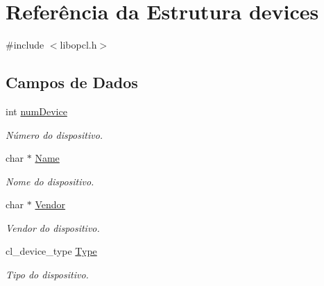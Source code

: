 \hypertarget{structdevices}{}\section{Referência da Estrutura devices}
\label{structdevices}


{\ttfamily \#include $<$libopcl.\+h$>$}

\subsection*{Campos de Dados}
\begin{DoxyCompactItemize}
\item 
\hypertarget{structdevices_a6856fb3bba012c7b3abcfbe847ea4d27}{}\label{structdevices_a6856fb3bba012c7b3abcfbe847ea4d27} 
int \hyperlink{structdevices_a6856fb3bba012c7b3abcfbe847ea4d27}{num\+Device}
\begin{DoxyCompactList}\small\item\em Número do dispositivo. \end{DoxyCompactList}\item 
\hypertarget{structdevices_a5e6182c030324511dd82e9fa1a0ab071}{}\label{structdevices_a5e6182c030324511dd82e9fa1a0ab071} 
char $\ast$ \hyperlink{structdevices_a5e6182c030324511dd82e9fa1a0ab071}{Name}
\begin{DoxyCompactList}\small\item\em Nome do dispositivo. \end{DoxyCompactList}\item 
\hypertarget{structdevices_a3edc9ba9f59b30aa97a8d6d258caa80f}{}\label{structdevices_a3edc9ba9f59b30aa97a8d6d258caa80f} 
char $\ast$ \hyperlink{structdevices_a3edc9ba9f59b30aa97a8d6d258caa80f}{Vendor}
\begin{DoxyCompactList}\small\item\em Vendor do dispositivo. \end{DoxyCompactList}\item 
\hypertarget{structdevices_af66389a0175743dbb20408cc354de4f1}{}\label{structdevices_af66389a0175743dbb20408cc354de4f1} 
cl\+\_\+device\+\_\+type \hyperlink{structdevices_af66389a0175743dbb20408cc354de4f1}{Type}
\begin{DoxyCompactList}\small\item\em Tipo do dispositivo. \end{DoxyCompactList}\item 
\hypertarget{structdevices_a1daa59b7c3a24931a3d38b8f2e30d2cd}{}\label{structdevices_a1daa59b7c3a24931a3d38b8f2e30d2cd} 

\end{DoxyCompactItemize}
